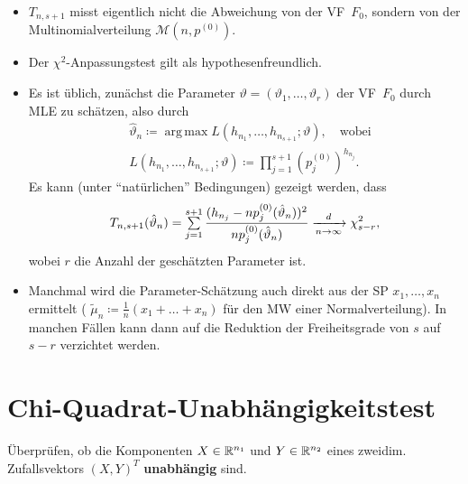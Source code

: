 \documentclass{cheat-sheet}
\DeclareMathOperator*{\argmax}{arg\,max}
\newcommand{\testh}[1]{\textcolor{TestColor}{\textbf{#1}}}
\newcommand{\MN}{\mathcal{M}} %
\begin{document}
\begin{samepage}

\begin{bemn}
  \begin{itemize}
    \item $T_{n,s+1}$ misst eigentlich nicht die Abweichung von der VF~$F_0$, sondern von der Multinomialverteilung $\MN(n, p^{(0)})$.
    \item Der $\chi^2$-Anpassungstest gilt als hypothesenfreundlich.
    \item Es ist üblich, zunächst die Parameter $\vartheta = (\vartheta_1, \ldots, \vartheta_r)$ der VF~$F_0$ durch MLE zu schätzen, also durch
    \begin{align*}
      & \hat{\vartheta}_n \coloneqq \argmax L(h_{n_1}, \ldots, h_{n_{s+1}}; \vartheta), \quad \text{wobei} \\
      & L(h_{n_1}, \ldots, h_{n_{s+1}}; \vartheta) \coloneqq \prod_{j=1}^{s+1} \left( p_j^{(0)} \right)^{h_{n_j}}.
    \end{align*}
    Es kann (unter "`natürlichen"' Bedingungen) gezeigt werden, dass
    \[ T_{n,s+1}(\hat{\vartheta}_n) = \sum_{j=1}^{s+1} \frac{(h_{n_j} - n p_j^{(0)}(\hat{\vartheta}_n))^2}{n p_j^{(0)}(\hat{\vartheta}_n)} \xra[n \to \infty]{d} \chi_{s-r}^2, \]
    wobei $r$ die Anzahl der geschätzten Parameter ist. %
    \item Manchmal wird die Parameter-Schätzung auch direkt aus der SP $x_1, \ldots, x_n$ ermittelt (\zB{} $\tilde{\mu}_n \coloneqq \tfrac{1}{n} (x_1 + \ldots + x_n)$ für den MW einer Normalverteilung).
    In manchen Fällen kann dann auf die Reduktion der Freiheitsgrade von $s$ auf $s-r$ verzichtet werden.
  \end{itemize}
\end{bemn}


\section{Chi-Quadrat-Unabhängigkeitstest}

\end{samepage}

\begin{ziel}
  Überprüfen, ob die Komponenten $X \in \mathbb{R}^{n_1}$ und $Y \in \mathbb{R}^{n_2}$ eines zweidim. Zufallsvektors $(X, Y)^T$ \testh{unabhängig} sind.
\end{ziel}
\end{document}
